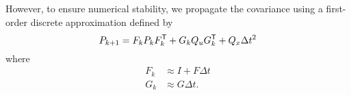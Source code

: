 However, to ensure numerical stability, we propagate the covariance using a first-order discrete approximation
defined by
\begin{equation}
  P_{k+1} = F_{k} P_{k} F_{k}^{\mathsf{T}} + G_k Q_u G_k^{\mathsf{T}} + Q_x \Delta
  t^2
\end{equation}
where
\begin{align}
  F_k &\approx I + F \Delta t \\
  G_k &\approx G \Delta t.
\end{align}


